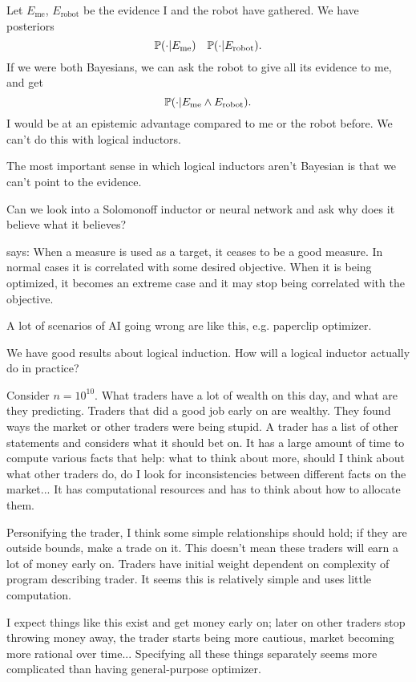 \documentclass[11pt]{article}
\begin{document}
Let $E_{\text{me}}$, $E_{\text{robot}}$ be the evidence I and the robot have gathered.
We have posteriors
$$
\mathbb{P}(\cdot |E_{\text{me}}) \quad \mathbb{P}(\cdot |E_{\text{robot}}).
$$
 If we were both Bayesians, we can ask the robot to give all its evidence to me, and get 
 $$
 \mathbb{P}(\cdot |E_{\text{me}}\wedge E_{\text{robot}}).
 $$
I would be at an epistemic advantage compared to me or the robot before.
We can't do this with logical inductors.
 
The most important sense in which logical inductors aren't Bayesian is that we can't point to the evidence.

Can we look into a Solomonoff inductor or neural network and ask why does it believe what it believes?

 says:
When a measure is used as a target, it ceases to be a good measure. In normal cases it is correlated with some desired objective. When it is being optimized, it becomes an extreme case and it may stop being correlated with the objective.

A lot of scenarios of AI going wrong are like this, e.g. paperclip optimizer.


We have good results about logical induction. How will a logical inductor actually do in practice?

Consider $n=10^{10}$. 
What traders have a lot of wealth on this day, and what are they predicting. Traders that did a good job early on are wealthy. They found ways the market or other traders were being stupid. A trader has a list of other statements and considers what it should bet on. It has a large amount of time to compute various facts that help: what to think about more, should I think about what other traders do, do I look for inconsistencies between different facts on the market... It has computational resources and has to think about how to allocate them.

Personifying the trader,  I think some simple relationships should hold; if they are outside bounds, make a trade on it. This doesn't mean these traders will earn a lot of money early on.
Traders have initial weight dependent on complexity of program describing trader. It seems this is relatively simple and uses little computation.

I expect things like this exist and get money early on; later on other traders stop throwing money away, the trader starts being more cautious, market becoming more rational over time... Specifying all these things separately seems more complicated than having general-purpose optimizer. 
\end{document}
